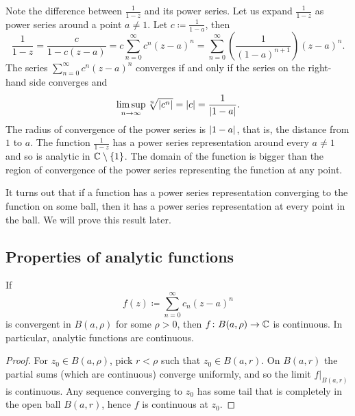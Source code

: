 \begin{example}
Note the difference between $\frac{1}{1-z}$ and its power series.  Let us
expand $\frac{1}{1-z}$ as power series around a point $a \not= 1$.
Let $c \coloneqq \frac{1}{1-a}$, then
\begin{equation*}
\frac{1}{1-z} = 
\frac{c}{1-c(z-a)}
=
c
\sum_{n=0}^\infty c^{n} {(z-a)}^n
=
\sum_{n=0}^\infty \left( \frac{1}{{(1-a)}^{n+1}} \right) {(z-a)}^n .
\end{equation*}
The series $\sum_{n=0}^\infty c^n {(z-a)}^n$ converges if and only if 
the series on the right-hand side converges and
\begin{equation*}
\limsup_{n\to\infty}
\sqrt[n]{\lvert {c^n} \rvert} = \lvert {c} \rvert
= \frac{1}{\lvert {1-a} \rvert} .
\end{equation*}
The radius of convergence of the power series is $\lvert {1-a} \rvert$, that is, the
distance from $1$ to $a$.  The function $\frac{1}{1-z}$
has a power series
representation around every $a\not= 1$ and so is analytic in ${\mathbb{C}} \setminus
\{ 1 \}$.
The domain of the function is bigger than the region
of convergence of the power series representing the function at any point.
\end{example}

It turns out that 
if a function has a power series representation converging to the function
on some ball,
then it has a power series representation at every point in the ball.  We will prove this
result later.

\subsection{Properties of analytic functions}

\begin{prop}
If
\begin{equation*}
f(z) \coloneqq \sum_{n=0}^\infty c_n {(z-a)}^n
\end{equation*}
is convergent in $B(a,\rho)$ for some $\rho > 0$, then
$f \colon B(a,\rho) \to {\mathbb{C}}$ is continuous.
In particular, analytic functions are continuous.
\end{prop}

\begin{proof}
For $z_0 \in B(a,\rho)$, pick $r < \rho$ such that $z_0 \in B(a,r)$.
On $B(a,r)$ the
partial sums (which are continuous) converge uniformly,
and so the limit $f|_{B(a,r)}$ is continuous.
Any sequence converging to
$z_0$ has some tail that is completely in the open ball $B(a,r)$,
hence $f$ is continuous at $z_0$.
\end{proof}

